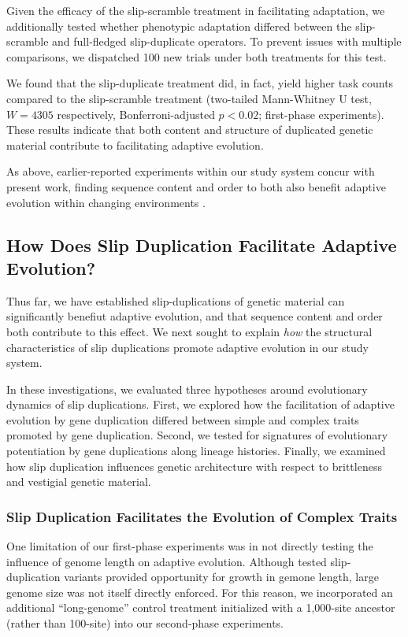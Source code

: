 Given the efficacy of the slip-scramble treatment in facilitating adaptation, we additionally tested whether phenotypic adaptation differed between the slip-scramble and full-fledged slip-duplicate operators.
To prevent issues with multiple comparisons, we dispatched 100 new trials under both treatments for this test.

We found that the slip-duplicate treatment did, in fact, yield higher task counts compared to the slip-scramble treatment (two-tailed Mann-Whitney U test, $W = 4305$ respectively, Bonferroni-adjusted $p < 0.02$; first-phase experiments).
These results indicate that both content and structure of duplicated genetic material contribute to facilitating adaptive evolution.

As above, earlier-reported experiments within our study system concur with present work, finding sequence content and order to both also benefit adaptive evolution within changing environments \citep{lalejini2017gene}.

\subsection{How Does Slip Duplication Facilitate Adaptive Evolution?}

Thus far, we have established slip-duplications of genetic material can significantly benefiut adaptive evolution, and that sequence content and order both contribute to this effect.
We next sought to explain \textit{how} the structural characteristics of slip duplications promote adaptive evolution in our study system.

In these investigations, we evaluated three hypotheses around evolutionary dynamics of slip duplications.
First, we explored how the facilitation of adaptive evolution by gene duplication differed between simple and complex traits promoted by gene duplication.
Second, we tested for signatures of evolutionary potentiation by gene duplications along lineage histories.
Finally, we examined how slip duplication influences genetic architecture with respect to brittleness and vestigial genetic material.

\subsubsection{Slip Duplication Facilitates the Evolution of Complex Traits}



One limitation of our first-phase experiments was in not directly testing the influence of genome length on adaptive evolution.
Although tested slip-duplication variants provided opportunity for growth in gemone length, large genome size was not itself directly enforced.
For this reason, we incorporated an additional ``long-genome'' control treatment initialized with a 1,000-site ancestor (rather than 100-site) into our second-phase experiments.

